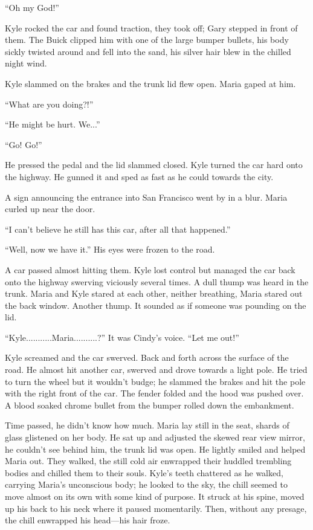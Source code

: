 ``Oh my God!''

Kyle rocked the car and found traction, they took off; Gary stepped in
front of them. The Buick clipped him with one of the large bumper
bullets, his body sickly twisted around and fell into the sand, his
silver hair blew in the chilled night wind.

Kyle slammed on the brakes and the trunk lid flew open. Maria gaped at
him.

``What are you doing?!''

``He might be hurt. We...''

``Go! Go!''

He pressed the pedal and the lid slammed closed. Kyle turned the car
hard onto the highway. He gunned it and sped as fast as he could towards
the city.

A sign announcing the entrance into San Francisco went by in a blur.
Maria curled up near the door.

``I can't believe he still has this car, after all that happened.''

``Well, now we have it.'' His eyes were frozen to the road.

A car passed almost hitting them. Kyle lost control but managed the car
back onto the highway swerving viciously several times. A dull thump was
heard in the trunk. Maria and Kyle stared at each other, neither
breathing, Maria stared out the back window. Another thump. It sounded
as if someone was pounding on the lid.

``Kyle...........Maria..........?'' It was Cindy's voice. ``Let me
out!''

Kyle screamed and the car swerved. Back and forth across the surface of
the road. He almost hit another car, swerved and drove towards a light
pole. He tried to turn the wheel but it wouldn't budge; he slammed the
brakes and hit the pole with the right front of the car. The fender
folded and the hood was pushed over. A blood soaked chrome bullet from
the bumper rolled down the embankment.

Time passed, he didn't know how much. Maria lay still in the seat,
shards of glass glistened on her body. He sat up and adjusted the skewed
rear view mirror, he couldn't see behind him, the trunk lid was open. He
lightly smiled and helped Maria out. They walked, the still cold air
enwrapped their huddled trembling bodies and chilled them to their
souls. Kyle's teeth chattered as he walked, carrying Maria's unconscious
body; he looked to the sky, the chill seemed to move almost on its own
with some kind of purpose. It struck at his spine, moved up his back to
his neck where it paused momentarily. Then, without any presage, the
chill enwrapped his head---his hair froze.

